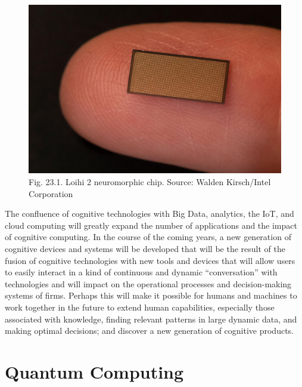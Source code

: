 \documentclass[
  letterpaper,
  DIV=11,
  numbers=noendperiod]{scrreprt}
\begin{document}
\begin{figure}

{\centering \includegraphics[width=6.25in,height=\textheight]{img/fig37.jpg}

}

\caption{Fig. 23.1. Loihi 2 neuromorphic chip. Source: Walden
Kirsch/Intel Corporation}

\end{figure}

The confluence of cognitive technologies with Big Data, analytics, the
IoT, and cloud computing will greatly expand the number of applications
and the impact of cognitive computing. In the course of the coming
years, a new generation of cognitive devices and systems will be
developed that will be the result of the fusion of cognitive
technologies with new tools and devices that will allow users to easily
interact in a kind of continuous and dynamic ``conversation'' with
technologies and will impact on the operational processes and
decision-making systems of firms. Perhaps this will make it possible for
humans and machines to work together in the future to extend human
capabilities, especially those associated with knowledge, finding
relevant patterns in large dynamic data, and making optimal decisions;
and discover a new generation of cognitive products.

\hypertarget{quantum-computing}{%
\section{Quantum Computing}\label{quantum-computing}}
\end{document}
